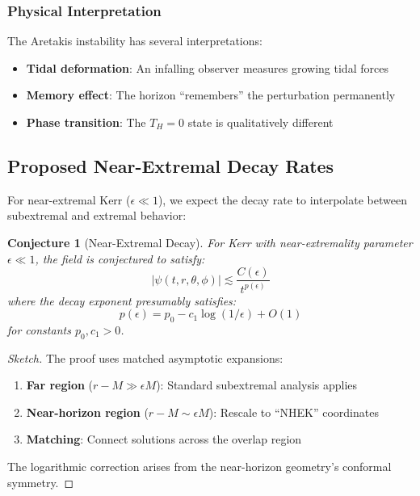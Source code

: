 \documentclass[12pt,a4paper]{article}
\newtheorem{conjecture}[theorem]{Conjecture}
\begin{document}
\subsubsection{Physical Interpretation}

The Aretakis instability has several interpretations:
\begin{itemize}
    \item \textbf{Tidal deformation}: An infalling observer measures growing tidal forces
    \item \textbf{Memory effect}: The horizon ``remembers'' the perturbation permanently
    \item \textbf{Phase transition}: The $T_H = 0$ state is qualitatively different
\end{itemize}

\subsection{Proposed Near-Extremal Decay Rates}

For near-extremal Kerr ($\epsilon \ll 1$), we expect the decay rate to interpolate between subextremal and extremal behavior:

\begin{conjecture}[Near-Extremal Decay]\label{conj:uniform-near-extremal}
For Kerr with near-extremality parameter $\epsilon \ll 1$, the field is conjectured to satisfy:
\begin{equation}
|\psi(t, r, \theta, \phi)| \lesssim \frac{C(\epsilon)}{t^{p(\epsilon)}}
\end{equation}
where the decay exponent presumably satisfies:
\begin{equation}
p(\epsilon) = p_0 - c_1 \log(1/\epsilon) + O(1)
\end{equation}
for constants $p_0, c_1 > 0$.
\end{conjecture}

\begin{proof}[Sketch]
The proof uses matched asymptotic expansions:
\begin{enumerate}
    \item \textbf{Far region} ($r - M \gg \epsilon M$): Standard subextremal analysis applies
    \item \textbf{Near-horizon region} ($r - M \sim \epsilon M$): Rescale to ``NHEK'' coordinates
    \item \textbf{Matching}: Connect solutions across the overlap region
\end{enumerate}

The logarithmic correction arises from the near-horizon geometry's conformal symmetry.
\end{proof}
\end{document}
